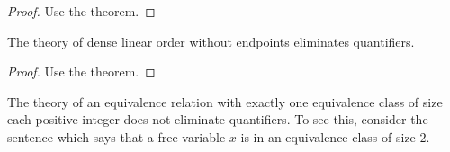 \documentclass[../notes.tex]{subfiles}
\begin{document}
\begin{proof}
	Use the theorem.
\end{proof}
\begin{corollary}
	The theory of dense linear order without endpoints eliminates quantifiers.
\end{corollary}
\begin{proof}
	Use the theorem.
\end{proof}
\begin{nex}
	The theory of an equivalence relation with exactly one equivalence class of size each positive integer does not eliminate quantifiers. To see this, consider the sentence which says that a free variable $x$ is in an equivalence class of size $2$.
\end{nex}
\end{document}
